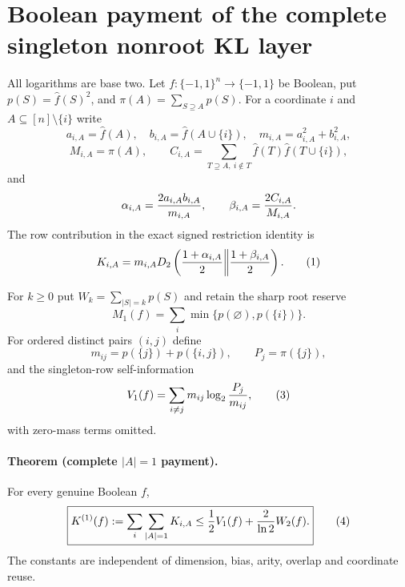 \section*{Boolean payment of the complete singleton nonroot KL layer}

All logarithms are base two.  Let $f:\{-1,1\}^n\to\{-1,1\}$ be
Boolean, put $p(S)=\widehat f(S)^2$, and
$\pi(A)=\sum_{S\supseteq A}p(S)$.  For a coordinate $i$ and
$A\subseteq[n]\setminus\{i\}$ write
\[
 a_{i,A}=\widehat f(A),\quad b_{i,A}=\widehat f(A\cup\{i\}),\quad
 m_{i,A}=a_{i,A}^2+b_{i,A}^2,
\]
\[
 M_{i,A}=\pi(A),\qquad
 C_{i,A}=\sum_{T\supseteq A,\ i\notin T}
              \widehat f(T)\widehat f(T\cup\{i\}),
\]
and
\[
 \alpha_{i,A}={2a_{i,A}b_{i,A}\over m_{i,A}},\qquad
 \beta_{i,A}={2C_{i,A}\over M_{i,A}}.
\]
The row contribution in the exact signed restriction identity is
\[
 K_{i,A}=m_{i,A}D_2\left({1+\alpha_{i,A}\over2}\middle\|
                           {1+\beta_{i,A}\over2}\right).       \tag{1}
\]

For $k\ge0$ put $W_k=\sum_{|S|=k}p(S)$ and retain the sharp root reserve
\[
 M_1(f)=\sum_i\min\{p(\varnothing),p(\{i\})\}.          \tag{2}
\]
For ordered distinct pairs $(i,j)$ define
\[
 m_{ij}=p(\{j\})+p(\{i,j\}),\qquad P_j=\pi(\{j\}),
\]
and the singleton-row self-information
\[
 V_1(f)=\sum_{i\ne j}m_{ij}\log_2{P_j\over m_{ij}},     \tag{3}
\]
with zero-mass terms omitted.

\paragraph{Theorem (complete $|A|=1$ payment).}
For every genuine Boolean $f$,
\[
 \boxed{
 K^{(1)}(f):=\sum_i\sum_{|A|=1}K_{i,A}
 \le {1\over2}V_1(f)+{2\over\ln2}W_2(f).}             \tag{4}
\]
The constants are independent of dimension, bias, arity, overlap and
coordinate reuse.

